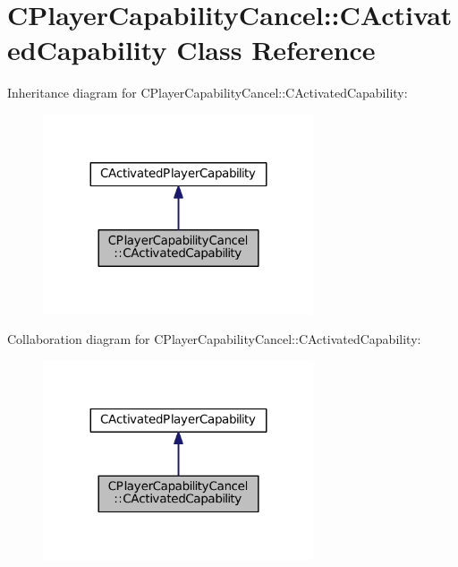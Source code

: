 \hypertarget{classCPlayerCapabilityCancel_1_1CActivatedCapability}{}\section{C\+Player\+Capability\+Cancel\+:\+:C\+Activated\+Capability Class Reference}
\label{classCPlayerCapabilityCancel_1_1CActivatedCapability}


Inheritance diagram for C\+Player\+Capability\+Cancel\+:\+:C\+Activated\+Capability\+:\nopagebreak
\begin{figure}[H]
\begin{center}
\leavevmode
\includegraphics[width=227pt]{classCPlayerCapabilityCancel_1_1CActivatedCapability__inherit__graph}
\end{center}
\end{figure}


Collaboration diagram for C\+Player\+Capability\+Cancel\+:\+:C\+Activated\+Capability\+:\nopagebreak
\begin{figure}[H]
\begin{center}
\leavevmode
\includegraphics[width=227pt]{classCPlayerCapabilityCancel_1_1CActivatedCapability__coll__graph}
\end{center}
\end{figure}
